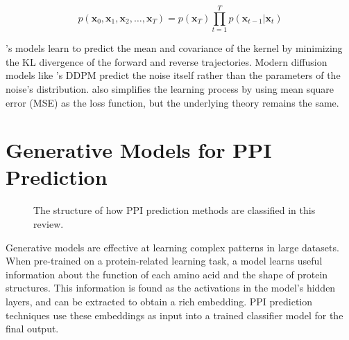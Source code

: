 \documentclass{article}
\begin{document}
\[p(\mathbf{x}_0, \mathbf{x}_1, \mathbf{x}_2, \ldots, \mathbf{x}_T) = p(\mathbf{x}_T)\prod_{t=1}^{T}p(\mathbf{x}_{t-1}|\mathbf{x}_t)\]

\citet{sohl-dickstein_deep_nodate}'s models learn to predict the mean and covariance of the kernel by minimizing the KL divergence of the forward and reverse trajectories. Modern diffusion models like \citet{ho_denoising_2020}'s DDPM predict the noise itself rather than the parameters of the noise's distribution. \citet{ho_denoising_2020} also simplifies the learning process by using mean square error (MSE) as the loss function, but the underlying theory remains the same. 

\section{Generative Models for PPI Prediction}
\begin{figure}[htbp]
  \centering
  \caption{The structure of how PPI prediction methods are classified in this review.}
  \label{classification_map}
\end{figure}


Generative models are effective at learning complex patterns in large datasets. When pre-trained on a protein-related learning task, a model learns useful information about the function of each amino acid and the shape of protein structures. This information is found as the activations in the model's hidden layers, and can be extracted to obtain a rich embedding. PPI prediction techniques use these embeddings as input into a trained classifier model for the final output.
\end{document}
